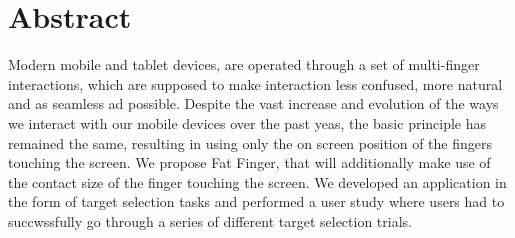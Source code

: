 \documentclass[10pt,twoside]{report}
\begin{document}
\thispagestyle{empty}
\maketitle

\pagestyle{plain}
\cleardoublepage

\chapter*{Abstract}

Modern mobile and tablet devices, are operated through a set of multi-finger interactions, which are supposed to make interaction less confused, more natural and as seamless ad possible.
Despite the vast increase and evolution of the ways we interact with our mobile devices over the past yeas, the basic principle has remained the same, resulting in using only the on screen position of the fingers touching the screen.
We propose Fat Finger, that will additionally make use of the contact size of the finger touching the screen.
We developed an application in the form of target selection tasks and performed a user study where users had to succwssfully go through a series of different target selection trials.
\end{document}
